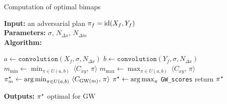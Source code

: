 \documentclass[9pt,xcolor={dvipsnames}]{beamer}
\begin{document}
\begin{frame}{Computation of optimal bimaps}
            \begin{algorithm}[H]
                \caption{Generating bimaps from adversarial examples.}
                \label{algorithm:bimap}
            \vspace{-2mm}
            \textbf{Input:} an adversarial plan $\pi_f=\operatorname{id}(X_f,Y_f)$\\
            \noindent\textbf{Parameters:} $\sigma$, $N_{\Delta x}$, $N_{\Delta m}$\\
            \textbf{Algorithm:}
            \begin{algorithmic}[1]
                \State $a\gets \texttt{convolution}(X_f,\sigma,N_{\Delta x})$
                \State $b\gets \texttt{convolution}(Y_f,\sigma,N_{\Delta x})$ 
                \State $m_{\text{min}}\gets \min_{\pi\in U(a,b)}\ \langle C_{xy},\,\pi\rangle$ 
                \State $m_{\text{max}}\gets \max_{\pi\in U(a,b)}\ \langle C_{xy},\,\pi\rangle$
                \State {}
                 
                    \State $\pi\opt_m\gets \argmin_{\pi\in U(a,b)}\ \langle C_{\GW(m)},\,\pi\rangle$ 
                    \State {}
                \EndFor
                \State $\pi^\star\gets\operatorname*{arg\,max}_\pi$ \texttt{GW\_scores} 
                \State return $\pi^\star$
                \end{algorithmic}
            \textbf{Outputs:} $\pi^\star$ optimal for GW
          \end{algorithm}
\end{frame}
\end{document}
